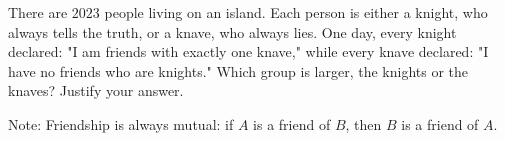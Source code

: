 There are $2023$ people living on an island. Each person is either a knight, who always tells the truth, or a knave, who always lies. One day, every knight declared: "I am friends with exactly one knave," while every knave declared: "I have no friends who are knights." Which group is larger, the knights or the knaves? Justify your answer.

Note: Friendship is always mutual: if $A$ is a friend of $B$, then $B$ is a friend of $A$.
